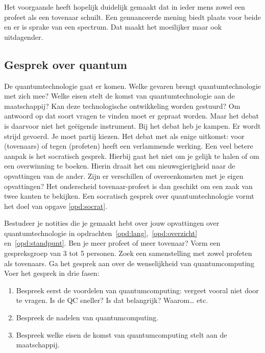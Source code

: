 \documentclass[../../main.tex]{subfiles}
\begin{document}
Het voorgaande heeft hopelijk duidelijk gemaakt dat in ieder mens zowel een profeet als een tovenaar schuilt. Een genuanceerde mening biedt plaats voor beide en er is sprake van een spectrum. Dat maakt het moeilijker  maar ook uitdagender. 

\subsection*{Gesprek over quantum}
De quantumtechnologie gaat er komen. Welke gevaren brengt quantumtechnologie met zich mee? Welke eisen stelt de komst van quantumtechnologie aan de maatschappij? Kan deze technologische ontwikkeling worden gestuurd?   Om antwoord op dat soort vragen te vinden moet er gepraat worden. Maar het debat is daarvoor niet het ge\"eigende instrument. Bij het debat heb je kampen. Er wordt strijd gevoerd. Je moet partij kiezen. 
Het debat met als enige uitkomst: voor (tovenaars) of tegen (profeten) heeft een verlammende werking. Een veel betere aanpak is het socratisch gesprek. Hierbij gaat het niet om je gelijk te halen of om een overwinning te boeken. Hierin draait het om nieuwsgierigheid naar de opvattingen van de ander. Zijn er verschillen of overeenkomsten met je eigen opvattingen? Het onderscheid tovenaar-profeet is dan geschikt om een zaak van twee kanten te bekijken. Een socratisch gesprek over quantumtechnologie vormt het doel van opgave \ref{opd:socrat}.

\begin{opdracht}\label{opd:socrat}
Bestudeer je notities die je gemaakt hebt  over jouw opvattingen over quantumtechnologie in opdrachten~\ref{opd:lang},~\ref{opd:overzicht} en~\ref{opd:standpunt}. Ben je meer profeet of meer tovenaar?
Vorm een gespreksgroep van 3 tot 5 personen. Zoek een samenstelling met zowel profeten als tovenaars. Ga het gesprek aan over de wenselijkheid van quantumcomputing 
Voer het gesprek in drie fasen:

\begin{enumerate}
\item Bespreek eerst de voordelen van quantumcomputing: vergeet vooral niet door te vragen. Is de QC sneller? Is dat belangrijk? Waarom… etc.
\item Bespreek de nadelen van quantumcomputing.
\item Bespreek welke eisen de komst van quantumcomputing  stelt aan de maatschappij. 
\end{enumerate}
\end{opdracht}
\end{document}

